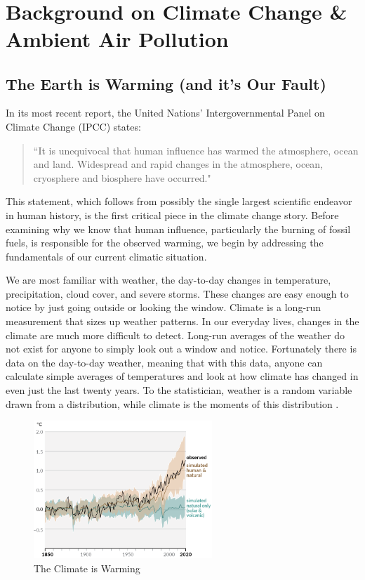 ~
\newpage
\section{Background on Climate Change \& Ambient Air Pollution}

\subsection{The Earth is Warming (and it's Our Fault)}

In its most recent report, the United Nations' Intergovernmental Panel on Climate Change (IPCC) states:
\begin{quote}
``It is unequivocal that human influence has warmed the atmosphere, ocean and land. Widespread and rapid changes in the atmosphere, ocean, cryosphere and biosphere have occurred." \citep{ipcc1_summary}
\end{quote}
This statement, which follows from possibly the single largest scientific endeavor in human history, is the first critical piece in the climate change story. Before examining why we know that human influence, particularly the burning of fossil fuels, is responsible for the observed warming, we begin by addressing the fundamentals of our current climatic situation. 

We are most familiar with weather, the day-to-day changes in temperature, precipitation, cloud cover, and severe storms. These changes are easy enough to notice by just going outside or looking the window. Climate is a long-run measurement that sizes up weather patterns. In our everyday lives, changes in the climate are much more difficult to detect. Long-run averages of the weather do not exist for anyone to simply look out a window and notice. Fortunately there is data on the day-to-day weather, meaning that with this data, anyone can calculate simple averages of temperatures and look at how climate has changed in even just the last twenty years. To the statistician, weather is a random variable drawn from a distribution, while climate is the moments of this distribution \citep{auffhammer2018quantifying}. 

\begin{figure}
\centering
\caption{The Climate is Warming \citep{ipcc1_summary}\label{ipcc1}}
\includegraphics[width=0.6\textwidth]{figures/chapter1_figures/ipcc_fig1.png}
\end{figure}


